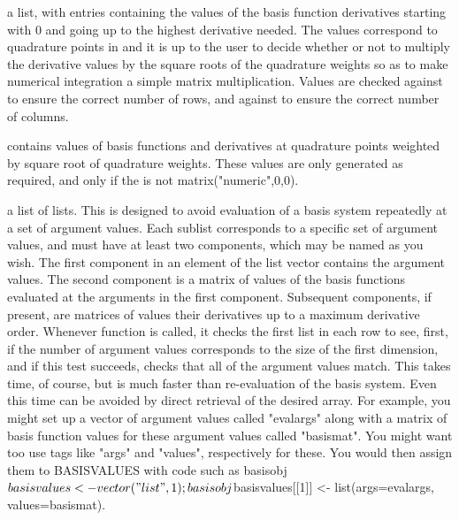 \documentclass{article}
\begin{document}
\begin{Arguments}
\begin{ldescription}
\item[\code{values}] a list, with entries containing the values of the basis function
derivatives starting with 0 and going up to the highest derivative
needed.  The values correspond to quadrature points in
 and it is up to the user to decide whether or not to
multiply the derivative values by the square roots of the quadrature
weights so as to make numerical integration a simple matrix
multiplication.  Values are checked against  to
ensure the correct number of rows, and against  to
ensure the correct number of columns.

 contains values of basis functions and derivatives at
quadrature points weighted by square root of quadrature weights.
These values are only generated as required, and only if the
 is not matrix("numeric",0,0).

\item[\code{basisvalues}] a list of lists.  This is designed to avoid evaluation of a basis
system repeatedly at a set of argument values. Each sublist
corresponds to a specific set of argument values, and must have at
least two components, which may be named as you wish.  The first
component in an element of the list vector contains the argument
values.  The second component is a matrix of values of the basis
functions evaluated at the arguments in the first component.
Subsequent components, if present, are matrices of values their
derivatives up to a maximum derivative order.  Whenever function
 is called, it checks the first list in each
row to see, first, if the number of argument values corresponds to
the size of the first dimension, and if this test succeeds, checks
that all of the argument values match.  This takes time, of course,
but is much faster than re-evaluation of the basis system.  Even
this time can be avoided by direct retrieval of the desired array.
For example, you might set up a vector of argument values called
"evalargs" along with a matrix of basis function values for these
argument values called "basismat".  You might want too use tags like
"args" and "values", respectively for these.  You would then assign
them to BASISVALUES with code such as basisobj$basisvalues <-
vector("list",1);  basisobj$basisvalues[[1]] <- list(args=evalargs,
values=basismat).

\end{ldescription}
\end{Arguments}
\end{document}
